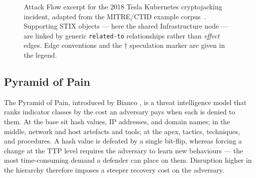 \begin{figure}[!t]
  \centering
  \caption{Attack Flow excerpt for the 2018 Tesla Kubernetes
  cryptojacking incident, adapted from the MITRE/CTID example
  corpus~\cite{ctid2025attackflow}. Supporting STIX objects --- here
  the shared Infrastructure node --- are linked by generic
  \texttt{related-to} relationships rather than \emph{effect} edges.
  Edge conventions and the
  $\dagger$ speculation marker are given in the legend.}
  \label{fig:attck-attackflow}
\end{figure}



\subsection{Pyramid of Pain}
\label{subsec:pop}

The Pyramid of Pain, introduced by Bianco \cite{bianco2013}, is a threat intelligence model that ranks indicator classes by the cost an adversary pays when each is denied to them. At the base sit hash values, IP addresses, and domain names; in the middle, network and host artefacts and tools; at the apex, tactics, techniques, and procedures. A hash value is defeated by a single bit-flip, whereas forcing a change at the TTP level requires the adversary to learn new behaviours --- the most time-consuming demand a defender can place on them. Disruption higher in the hierarchy therefore imposes a steeper recovery cost on the adversary.

